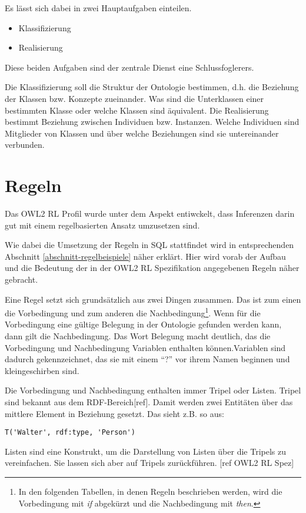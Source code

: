Es lässt sich dabei in zwei Hauptaufgaben einteilen.
\begin{itemize}
  \item Klassifizierung
  \item Realisierung
\end{itemize}
Diese beiden Aufgaben sind der zentrale Dienst eine Schlussfoglerers. 

Die Klassifizierung soll die Struktur der Ontologie bestimmen, d.h. die Beziehung der Klassen bzw. Konzepte zueinander. Was sind die Unterklassen einer bestimmten Klasse oder welche Klassen sind äquivalent.
Die Realisierung bestimmt Beziehung zwischen Individuen bzw. Instanzen. Welche Individuen sind Mitglieder von Klassen und über welche Beziehungen sind sie untereinander verbunden.

\section{Regeln}
Das OWL2 RL Profil wurde unter dem Aspekt entiwckelt, dass Inferenzen darin gut mit einem regelbasierten Ansatz umzusetzen sind.

Wie dabei die Umsetzung der Regeln in SQL stattfindet wird in entsprechenden Abschnitt \ref{abschnitt-regelbeispiele} näher erklärt. Hier wird vorab der Aufbau und die Bedeutung der in der OWL2 RL Spezifikation angegebenen Regeln näher gebracht.

Eine Regel setzt sich grundsätzlich aus zwei Dingen zusammen. Das ist zum einen die Vorbedingung und zum anderen die Nachbedingung\footnote{In den folgenden Tabellen, in denen Regeln beschrieben werden, wird die Vorbedingung mit \emph{if} abgekürzt und die Nachbedingung mit \emph{then}.}. Wenn für die Vorbedingung eine gültige Belegung in der Ontologie gefunden werden kann, dann gilt die Nachbedingung. Das Wort Belegung macht deutlich, das die Vorbedingung und Nachbedingung Variablen enthalten können.Variablen sind dadurch gekennzeichnet, das sie mit einem ``?'' vor ihrem Namen beginnen und kleingeschirben sind.

Die Vorbedingung und Nachbedingung enthalten immer Tripel oder Listen. Tripel sind bekannt aus dem RDF-Bereich[ref]. Damit werden zwei Entitäten über das mittlere Element in Beziehung gesetzt. Das sieht z.B. so aus:
\begin{verbatim}
T('Walter', rdf:type, 'Person')
\end{verbatim}
Listen sind eine Konstrukt, um die Darstellung von Listen über die Tripels zu vereinfachen. Sie lassen sich aber auf Tripels zurückführen. [ref OWL2 RL Spez]

